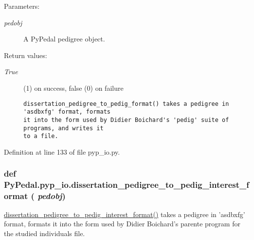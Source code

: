 \begin{Desc}
\item[Parameters:]
\begin{description}
\item[{\em pedobj}]A Py\-Pedal pedigree object. \end{description}
\end{Desc}
\begin{Desc}
\item[Return values:]
\begin{description}
\item[{\em True}](1) on success, false (0) on failure

\footnotesize\begin{verbatim}dissertation_pedigree_to_pedig_format() takes a pedigree in 'asdbxfg' format, formats
it into the form used by Didier Boichard's 'pedig' suite of programs, and writes it
to a file.
\end{verbatim}
\normalsize
 \end{description}
\end{Desc}


Definition at line 133 of file pyp\_\-io.py.\hypertarget{namespacePyPedal_1_1pyp__io_ba3d62ddd7ba34198d64a66deeebf665}{
\subsubsection[dissertation\_\-pedigree\_\-to\_\-pedig\_\-interest\_\-format]{\setlength{\rightskip}{0pt plus 5cm}def Py\-Pedal.pyp\_\-io.dissertation\_\-pedigree\_\-to\_\-pedig\_\-interest\_\-format ( {\em pedobj})}}
\label{namespacePyPedal_1_1pyp__io_ba3d62ddd7ba34198d64a66deeebf665}


\hyperlink{namespacePyPedal_1_1pyp__io_ba3d62ddd7ba34198d64a66deeebf665}{dissertation\_\-pedigree\_\-to\_\-pedig\_\-interest\_\-format()} takes a pedigree in 'asdbxfg' format, formats it into the form used by Didier Boichard's parente program for the studied individuals file. 

